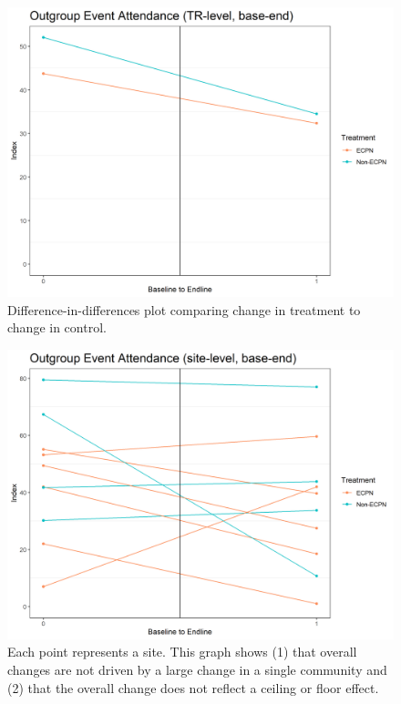 \documentclass[
]{article}
\begin{document}
\begin{figure}[H]
\centering
\includegraphics[width=\linewidth]{../data_and_code/obs_dat/b_analysis/event_outgroup_TrTime.plot.png}
\caption{Difference-in-differences plot comparing change in treatment to change in control.}\label{fig:market_past_TrTime}
\end{figure}

\begin{figure}[H]
\centering
\includegraphics[width=\linewidth]{../data_and_code/obs_dat/b_analysis/events_outgroup_siteTime.plot.png}
\caption{Each point represents a site. This graph shows (1) that overall changes are not driven by a large change in a single community and (2) that the overall change does not reflect a ceiling or floor effect.}\label{fig:events_outgroup_siteTime}
\end{figure}
\end{document}
